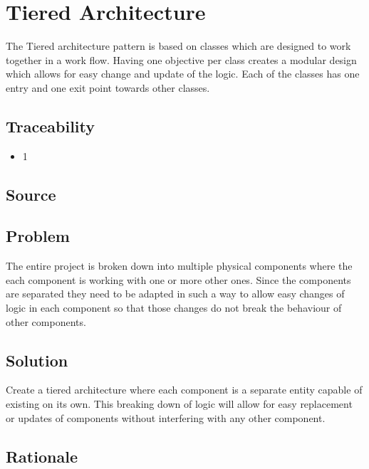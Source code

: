 

\section{Tiered Architecture}

	
	The Tiered architecture pattern is based on classes which are designed to work together in a work flow. Having one objective per class creates a modular design which allows for easy change and update of the logic. Each of the classes has one entry and one exit point towards other classes. 
	
	\subsection{Traceability} 
		\begin{itemize}
			\item 1
		\end{itemize}

	\subsection{Source} \cite{book:design-patterns}

	\subsection{Problem}

	The entire project is broken down into multiple physical components where the each component is working with one or more other ones. Since the components are separated they need to be adapted in such a way to allow easy changes of logic in each component so that those changes do not break the behaviour of other components.

	\subsection{Solution} 

	Create a tiered architecture where each component is a separate entity capable of existing on its own. This breaking down of logic will allow for easy replacement or updates of components without interfering with any other component. 

	\subsection{Rationale} \label{tiers:rationale}


